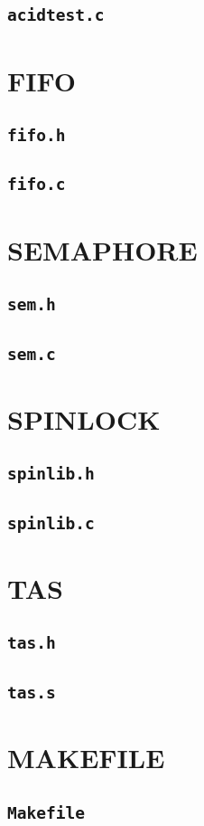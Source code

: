 \documentclass[11pt,a4paper]{article}
\begin{document}
\subsection*{\texttt{acidtest.c}}


\pagebreak

\section*{FIFO}
\subsection*{\texttt{fifo.h}}

\subsection*{\texttt{fifo.c}}


\pagebreak

\section*{SEMAPHORE}
\subsection*{\texttt{sem.h}}

\subsection*{\texttt{sem.c}}


\pagebreak

\section*{SPINLOCK}
\subsection*{\texttt{spinlib.h}}

\subsection*{\texttt{spinlib.c}}


\section*{TAS}
\subsection*{\texttt{tas.h}}

\subsection*{\texttt{tas.s}}


\pagebreak

\section*{MAKEFILE}
\subsection*{\texttt{Makefile}}

\end{document}
